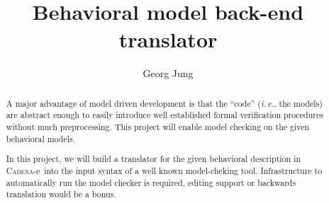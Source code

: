 \documentclass[a4paper]{article}
\title{Behavioral model back-end translator}
\author{Georg Jung}
\newcommand{\CADENA}{\textsc{Cadena}-e}
\begin{document}
\maketitle

\begin{abstract}
  A major advantage of model driven development is that the ``code''
  (\emph{i.\,e.}, the models) are abstract enough to easily introduce
  well established formal verification procedures without much
  preprocessing. This project will enable model checking on the given
  behavioral models.

  In this project, we will build a translator for the given behavioral
  description in \CADENA\ into the input syntax of a well known
  model-cheking tool. Infrastructure to automatically run the model
  checker is required, editing support or backwards translation would
  be a bonus.
\end{abstract}
\end{document}
